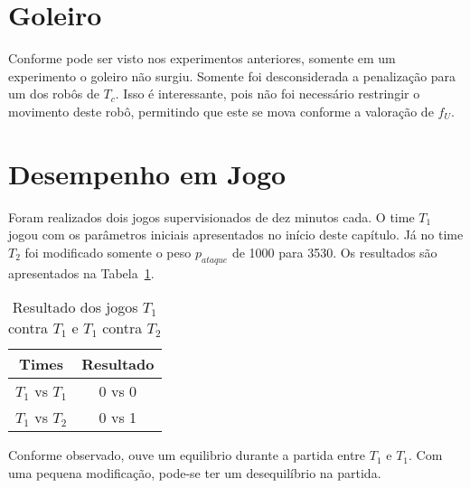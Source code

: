 
%
%
%




\section{Goleiro}
Conforme pode ser visto nos experimentos anteriores,
somente em um experimento o goleiro não surgiu.
Somente foi desconsiderada a penalização para um
dos robôs de $T_c$. Isso é interessante, pois
não foi necessário restringir o movimento deste
robô, permitindo que este se mova conforme a
valoração de $f_U$.

\section{Desempenho em Jogo}
Foram realizados dois jogos supervisionados de dez minutos cada.
O time $T_1$ jogou com os parâmetros iniciais apresentados no
início deste capítulo. Já no time $T_2$ foi modificado
somente o peso $p_{ataque}$ de 1000 para 3530. Os resultados são apresentados
na Tabela~\ref{tab:games}.

\begin{table}[H]
  \begin{center}
  \begin{tabular}{|c|c|}
    \hline
    Times      & Resultado \\
    \hline
    $T_1$ vs $T_1$ &  0 vs 0   \\
    \hline
    $T_1$ vs $T_2$ &  0 vs 1   \\
    \hline
  \end{tabular}
  \caption{Resultado dos jogos $T_1$ contra $T_1$ e $T_1$ contra $T_2$}\label{tab:games}
  \end{center}
\end{table}

Conforme observado, ouve um equilibrio durante a
partida entre $T_1$ e $T_1$. Com uma pequena
modificação, pode-se ter um desequilíbrio na
partida.
